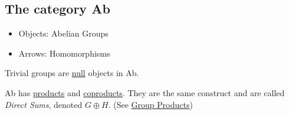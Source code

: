 \subsection{The category Ab}
\begin{itemize}
  \item Objects: Abelian Groups
  \item Arrows: Homomorphisms
\end{itemize}

\begin{proposition}
Trivial groups are \hyperref[null]{null} objects in Ab.
\end{proposition}

\begin{proposition}
Ab has \hyperref[products]{products} and \hyperref[coproducts]{coproducts}. They are the same
construct and are called \emph{Direct Sums}, denoted $G \oplus H$. (See \hyperref[groupproduct]{Group Products})
\end{proposition}
